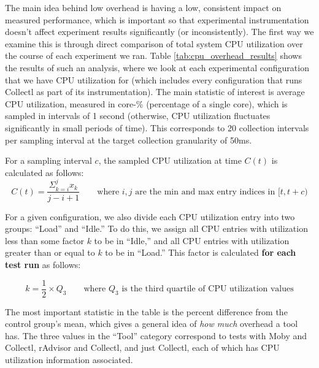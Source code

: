 \documentclass[a4paper,11pt]{article}
\begin{document}
The main idea behind low overhead is having a low, consistent impact on measured performance,
which is important so that experimental instrumentation
doesn't affect experiment results significantly (or inconsistently).
The first way we examine this is through direct comparison of total system CPU utilization
over the course of each experiment we ran.
Table \ref{tab:cpu_overhead_results} shows the results of such an analysis,
where we look at each experimental configuration that we have CPU utilization for
(which includes every configuration that runs Collectl as part of its instrumentation).
The main statistic of interest is average CPU utilization,
measured in core-\% (percentage of a single core),
which is sampled in intervals of 1 second
(otherwise, CPU utilization fluctuates significantly in small periods of time).
This corresponds to 20 collection intervals per sampling interval at the target collection granularity of 50ms.

For a sampling interval $c$, the sampled CPU utilization at time $C(t)$ is calculated as follows:
\vspace{0.1em}
\begin{equation}
    C(t) = \frac{\Sigma_{k=i}^j x_k}{j - i + 1}\qquad\textrm{where $i,j$ are the min and max entry indices in $[t, t+c)$}
\end{equation}
\vspace{-1.3em}

For a given configuration, we also divide each CPU utilization entry into two groups:
``Load'' and ``Idle.''
To do this, we assign all CPU entries with utilization less than some factor $k$ to be in ``Idle,''
and all CPU entries with utilization greater than or equal to $k$ to be in ``Load.''
This factor is calculated \textbf{for each test run} as follows:

\vspace{-0.85em}
\begin{equation}
    k = \frac{1}{2}\times Q_3\qquad\textrm{where $Q_3$ is the third quartile of CPU utilization values}
\end{equation}
\vspace{-1.1em}

The most important statistic in the table is the percent difference from the control group's mean,
which gives a general idea of \textit{how much} overhead a tool has.
The three values in the ``Tool'' category correspond to tests
with Moby and Collectl, rAdvisor and Collectl, and just Collectl,
each of which has CPU utilization information associated.
\end{document}
